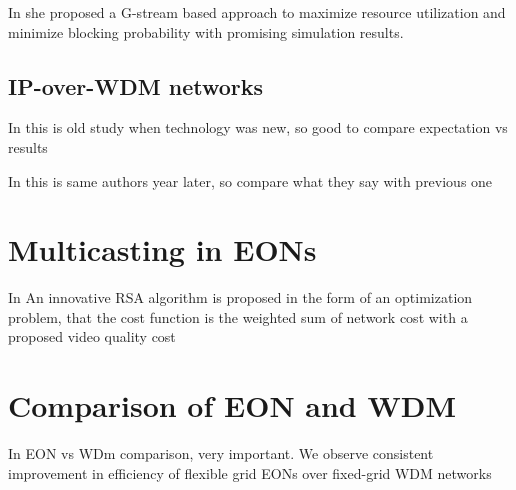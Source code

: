 \documentclass[conference]{IEEEtran}
\begin{document}
In \cite{wdm_paira} she proposed a G-stream based approach to maximize resource utilization and minimize blocking probability with promising simulation results.

\subsection{IP-over-WDM networks}
In \cite{wdm_qiao} this is old study when technology was new, so good to compare expectation vs results

In \cite{wdm_zhang} this is same authors year later, so compare what they say with previous one

\section{Multicasting in EONs}
In \cite{eon_ghazijahani} An innovative RSA algorithm is proposed in the form of an optimization problem, that the cost function is the weighted sum of network cost with a proposed video quality cost

\section{Comparison of EON and WDM}
In \cite{wdm_eon_comparison} EON vs WDm comparison, very important. We observe consistent improvement in efficiency of flexible grid EONs over fixed-grid WDM networks
\end{document}
